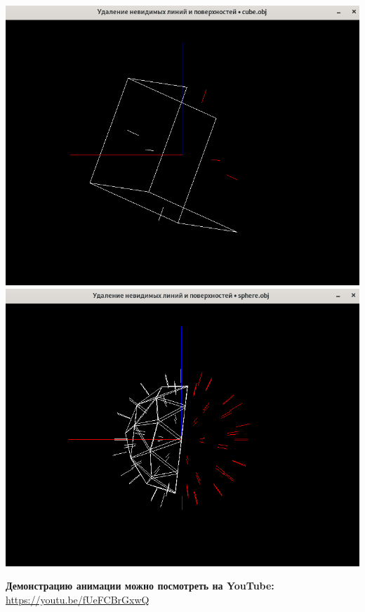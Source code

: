 \documentclass[a4paper,12pt]{article}
\begin{document}
\begin{flushleft}
  \includegraphics[scale=1.5]{axis_rotate_normals.png}\linebreak
  \includegraphics[scale=1.5]{sphere_rotate_normals.png}
\end{flushleft}
\begin{flushleft}
  \textbf{Демонстрацию анимации можно посмотреть на YouTube:} \url{https://youtu.be/fUeFCBrGxwQ}
\end{flushleft}
\end{document}
